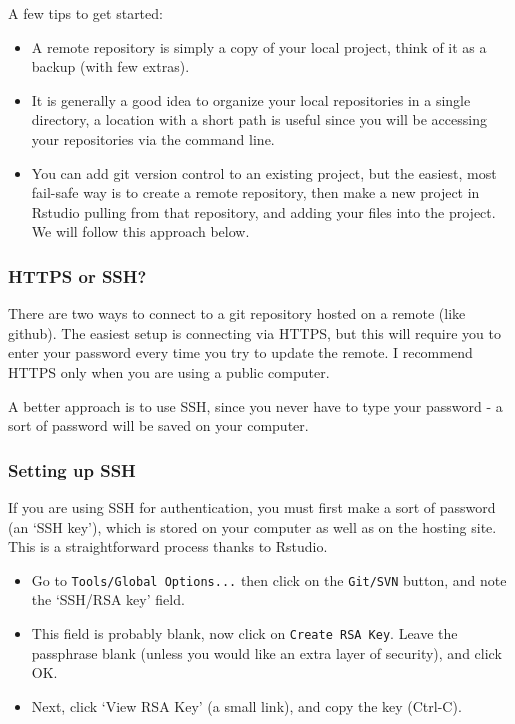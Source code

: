 \documentclass[]{book}
\providecommand{\tightlist}{%
  \setlength{\itemsep}{0pt}\setlength{\parskip}{0pt}}
\begin{document}
A few tips to get started:

\begin{itemize}
\tightlist
\item
  A remote repository is simply a copy of your local project, think of it as a backup (with few extras).
\item
  It is generally a good idea to organize your local repositories in a single directory, a location with a short path is useful since you will be accessing your repositories via the command line.
\item
  You can add git version control to an existing project, but the easiest, most fail-safe way is to create a remote repository, then make a new project in Rstudio pulling from that repository, and adding your files into the project. We will follow this approach below.
\end{itemize}

\hypertarget{https-or-ssh}{%
\subsubsection{HTTPS or SSH?}\label{https-or-ssh}}

There are two ways to connect to a git repository hosted on a remote (like github). The easiest setup is connecting via HTTPS, but this will require you to enter your password every time you try to update the remote. I recommend HTTPS only when you are using a public computer.

A better approach is to use SSH, since you never have to type your password - a sort of password will be saved on your computer.

\hypertarget{setting-up-ssh}{%
\subsubsection{Setting up SSH}\label{setting-up-ssh}}

If you are using SSH for authentication, you must first make a sort of password (an `SSH key'), which is stored on your computer as well as on the hosting site. This is a straightforward process thanks to Rstudio.

\begin{itemize}
\tightlist
\item
  Go to \texttt{Tools/Global\ Options...} then click on the \texttt{Git/SVN} button, and note the `SSH/RSA key' field.
\item
  This field is probably blank, now click on \texttt{Create\ RSA\ Key}. Leave the passphrase blank (unless you would like an extra layer of security), and click OK.
\item
  Next, click `View RSA Key' (a small link), and copy the key (Ctrl-C).
\end{itemize}
\end{document}
